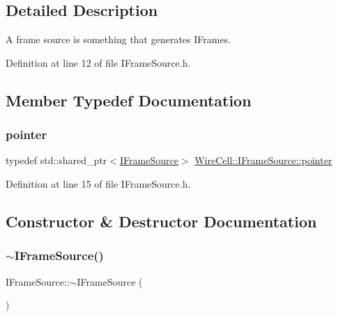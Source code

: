 \subsection{Detailed Description}
A frame source is something that generates I\+Frames. 

Definition at line 12 of file I\+Frame\+Source.\+h.



\subsection{Member Typedef Documentation}
\mbox{\label{class_wire_cell_1_1_i_frame_source_a1a5173edbaf8f3317b3c93baa9b12dc6}} 
\subsubsection{\texorpdfstring{pointer}{pointer}}
{\footnotesize\ttfamily typedef std\+::shared\+\_\+ptr$<$\hyperlink{class_wire_cell_1_1_i_frame_source}{I\+Frame\+Source}$>$ \hyperlink{class_wire_cell_1_1_i_frame_source_a1a5173edbaf8f3317b3c93baa9b12dc6}{Wire\+Cell\+::\+I\+Frame\+Source\+::pointer}}



Definition at line 15 of file I\+Frame\+Source.\+h.



\subsection{Constructor \& Destructor Documentation}
\mbox{\label{class_wire_cell_1_1_i_frame_source_a914c0d60dd1801a92653dd4138d15cb9}} 
\subsubsection{\texorpdfstring{$\sim$\+I\+Frame\+Source()}{~IFrameSource()}}
{\footnotesize\ttfamily I\+Frame\+Source\+::$\sim$\+I\+Frame\+Source (\begin{DoxyParamCaption}{ }\end{DoxyParamCaption})\hspace{0.3cm}{\ttfamily [virtual]}}



